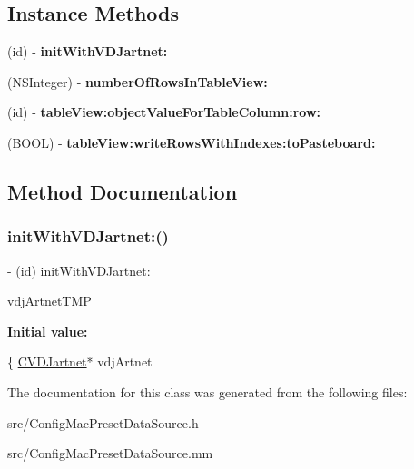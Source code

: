 \subsection*{Instance Methods}
\begin{DoxyCompactItemize}
\item 
(id) -\/ {\bfseries init\+With\+V\+D\+Jartnet\+:}
\item 
\mbox{\label{interfaceConfigPresetDataSource_a9b2f2c389b66cbb8b0d8ead92c89dfbe}} 
(N\+S\+Integer) -\/ {\bfseries number\+Of\+Rows\+In\+Table\+View\+:}
\item 
\mbox{\label{interfaceConfigPresetDataSource_a016a352e7ee71c2a1b8672ed6c72de6e}} 
(id) -\/ {\bfseries table\+View\+:object\+Value\+For\+Table\+Column\+:row\+:}
\item 
\mbox{\label{interfaceConfigPresetDataSource_a98f7fe5b7e450ae9a584a7391795d330}} 
(B\+O\+OL) -\/ {\bfseries table\+View\+:write\+Rows\+With\+Indexes\+:to\+Pasteboard\+:}
\end{DoxyCompactItemize}


\subsection{Method Documentation}
\mbox{\label{interfaceConfigPresetDataSource_aa9dd674164d07d7f57974cb9242a9a5c}} 
\subsubsection{\texorpdfstring{init\+With\+V\+D\+Jartnet\+:()}{initWithVDJartnet:()}}
{\footnotesize\ttfamily -\/ (id) init\+With\+V\+D\+Jartnet\+: \begin{DoxyParamCaption}\item[{(\hyperlink{classCVDJartnet}{C\+V\+D\+Jartnet}$\ast$)}]{vdj\+Artnet\+T\+MP }\end{DoxyParamCaption}}

{\bfseries Initial value\+:}
\begin{DoxyCode}
\{
    \hyperlink{classCVDJartnet}{CVDJartnet}* vdjArtnet
\end{DoxyCode}


The documentation for this class was generated from the following files\+:\begin{DoxyCompactItemize}
\item 
src/Config\+Mac\+Preset\+Data\+Source.\+h\item 
src/Config\+Mac\+Preset\+Data\+Source.\+mm\end{DoxyCompactItemize}
